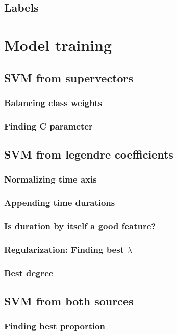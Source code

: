 \documentclass[11pt,a4paper]{tesis}
\begin{document}
		\subsection{Labels}
	\section{Model training}
		\subsection{SVM from supervectors}
			\subsubsection{Balancing class weights}
			\subsubsection{Finding C parameter}
		\subsection{SVM from legendre coefficients}
			\subsubsection{Normalizing time axis}
			\subsubsection{Appending time durations}
			\subsubsection{Is duration by itself a good feature?}
			\subsubsection{Regularization: Finding best $\lambda$}
			\subsubsection{Best degree}
		\subsection{SVM from both sources}
			\subsubsection{Finding best proportion}
\end{document}
